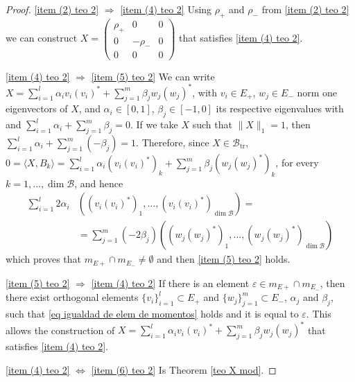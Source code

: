 \documentclass[12pt,a4paper]{article}
\def\calB{\mathcal B}
\def\tr{\text{tr}}
\numberwithin{equation}{section}
\begin{document}
\begin{proof}
\ref{item (2) teo 2} $\Rightarrow$ \ref{item (4) teo 2}  Using $\rho_+$ and $\rho_-$ from \ref{item (2) teo 2} we can construct $X=\left(\begin{smallmatrix}
	\rho_+&0&0\\ 0&-\rho_-&0\\0&0&0
\end{smallmatrix}\right)$ that satisfies \ref{item (4) teo 2}.

\ref{item (4) teo 2} $\Rightarrow$ \ref{item (5) teo 2} 
We can write $X=\sum_{i=1}^l\alpha_i v_i (v_i)^*+\sum_{j=1}^m\beta_j w_j(w_j)^*$, with $v_i\in E_+$, $w_j\in E_-$ norm one eigenvectors of $X$, and $\alpha_i\in[0,1]$, $\beta_j\in[-1,0]$ its respective eigenvalues with and $\sum_{i=1}^l\alpha_i +\sum_{j=1}^m\beta_j=0$. If we take $X$ such that $\|X\|_1=1$, then $\sum_{i=1}^l\alpha_i +\sum_{j=1}^m(-\beta_j)=1$. Therefore, since $X\in \calB_{\tr}$, $0=\langle X,B_k\rangle=\sum_{i=1}^l\alpha_i \left(v_i (v_i)^*\right)_k+\sum_{j=1}^m\beta_j\left( w_j(w_j)^*\right)_k$, for every $k=1,\dots,\dim \calB$, and hence
\begin{equation}
	\label{eq igualdad de elem de momentos}
	\begin{split}
		\sum_{i=1}^l 2\alpha_i & \left(\left(v_i (v_i)^*\right)_1,\dots, \left(v_i (v_i)^*\right)_{\dim \calB}\right)=\\
		&=\sum_{j=1}^m(-2\beta_j)\left(\left( w_j(w_j)^*\right)_1,\dots,\left( w_j(w_j)^*\right)_{\dim\calB}\right)
		\end{split}
\end{equation}
which proves that $m_{E+}\cap m_{E_-}\neq \emptyset$ and then \ref{item (5) teo 2} holds.

\ref{item (5) teo 2} $\Rightarrow$ \ref{item (4) teo 2} If there is an element  $\varepsilon\in m_{E+}\cap m_{E_-}$, then there exist orthogonal elements $\{v_i\}_{i=1}^l\subset E_+$ and 
$\{w_j\}_{j=1}^m\subset E_-$, $\alpha_j$ and $\beta_j$, such that \eqref{eq igualdad de elem de momentos} holds and it is equal to $\varepsilon$. This allows the construction of $X=\sum_{i=1}^l\alpha_i v_i (v_i)^*+\sum_{j=1}^m\beta_j w_j(w_j)^*$ that satisfies \ref{item (4) teo 2}.

\ref{item (4) teo 2} $\Leftrightarrow$ \ref{item (6) teo 2} Is Theorem \ref{teo X mod}.
 \end{proof}
 
\end{document}
